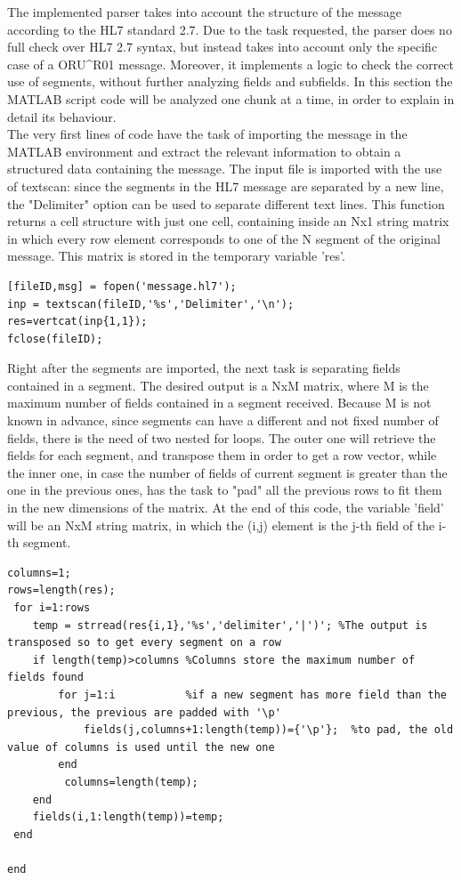 \documentclass[a4paper,titlepage]{article}
\begin{document}
The implemented parser takes into account the structure of the message according to the HL7 standard 2.7. Due to the task requested, the parser does no full check over HL7 2.7 syntax, but instead takes into account only the specific case of a ORU\textasciicircum R01 message.
Moreover, it implements a logic to check the correct use of segments, without further analyzing fields and subfields.
In this section the MATLAB script code will be analyzed one chunk at a time, in order to explain in detail its behaviour.\\
The very first lines of code have the task of importing the message in the MATLAB environment and extract the relevant information to obtain
a structured data containing the message. The input file is imported with the use of textscan: since the segments in the HL7 message are separated by a new line, the "Delimiter" option can be used to separate different text lines. This function returns a cell structure with just one cell, containing inside an Nx1 string matrix in which every row element corresponds to one of the N segment of the original message.
This matrix is stored in the temporary variable 'res'.
\begin{lstlisting}[caption=Message import]
[fileID,msg] = fopen('message.hl7');
inp = textscan(fileID,'%s','Delimiter','\n');
res=vertcat(inp{1,1});
fclose(fileID);
\end{lstlisting}

Right after the segments are imported, the next task is separating fields contained in a segment. The desired output is a NxM matrix, where M is the maximum number of fields contained in a segment received.
Because M is not known in advance, since segments can have a different and not fixed number of fields, there is the need of two nested for loops. The outer one will retrieve the fields for each segment, and transpose them in order to get a row vector, while the inner one, in case the number of fields of current segment is greater than the one in the previous ones, has the task to "pad" all the previous rows to fit them in the new dimensions of the matrix.
At the end of this code, the variable 'field' will be an NxM string matrix, in which the (i,j) element is the j-th field of the i-th segment.
\begin{lstlisting}[caption=Message formatting]
columns=1;
rows=length(res);
 for i=1:rows
    temp = strread(res{i,1},'%s','delimiter','|')'; %The output is transposed so to get every segment on a row
    if length(temp)>columns %Columns store the maximum number of fields found
        for j=1:i           %if a new segment has more field than the previous, the previous are padded with '\p'
            fields(j,columns+1:length(temp))={'\p'};  %to pad, the old value of columns is used until the new one
        end
         columns=length(temp);
    end
    fields(i,1:length(temp))=temp;
 end
     
end
\end{lstlisting}
\end{document}
